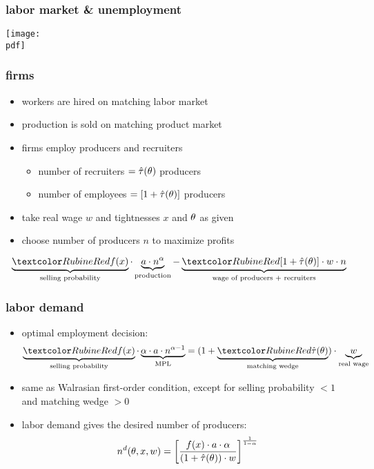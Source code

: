 \documentclass[12pt,xcolor={dvipsnames},hyperref={pdftex,pdfpagemode=UseNone,hidelinks,pdfdisplaydoctitle=true},usepdftitle=false]{beamer}
\def\pdf{xad.pdf}
\begin{document}
\begin{frame}
\frametitle{labor market \& unemployment}
\texttt{[image: \\pdf]}%
\end{frame}

\begin{frame}
\frametitle{firms}
\begin{itemize}
\item workers are hired on matching labor market
\item production is sold on matching product market
\item firms employ producers and recruiters
\begin{itemize}
	\item number of recruiters $=\hat{\tau}(\theta)$ \texttimes\; producers
	\item number of employees $=\left[ 1+\hat{\tau}(\theta) \right]$ \texttimes\; producers
\end{itemize}
\item take real wage $w$ and tightnesses $x$ and $\theta$ as given
\item choose number of producers $n$ to maximize profits
\end{itemize}
\begin{equation*}
\underbrace{\al{f(x)}}_{\text{selling probability}}\cdot  \underbrace{a\cdot n^{\a}}_{\text{production}} - \underbrace{\al{\bs{1+\hat{\tau}(\t)}}\cdot w\cdot n}_{\text{wage of producers + recruiters}}
\end{equation*}
\end{frame}

\begin{frame}
\frametitle{labor demand}
\begin{itemize}
\item optimal employment decision:
\begin{equation*}
\underbrace{\al{f(x)}}_{\text{selling probability}}\cdot \underbrace{\a\cdot a\cdot  n^{\a-1}}_{\text{MPL}}=(1+\underbrace{\al{\hat{\tau}(\t)}}_{\text{matching wedge}})\cdot \underbrace{w}_{\text{real wage}}
\end{equation*}
\item same as Walrasian first-order condition, except for selling probability $<1$ and matching wedge $>0$ 
\item labor demand gives the desired number of producers:
\begin{equation*}
n^{d}(\theta,x,w) = \left[ \frac{f(x)\cdot a\cdot \alpha}{\left( 1+\hat{\tau}(\theta) \right)\cdot w} \right]^{\frac{1}{1-\alpha}}
\end{equation*}
\end{itemize}
\end{frame}
\end{document}
